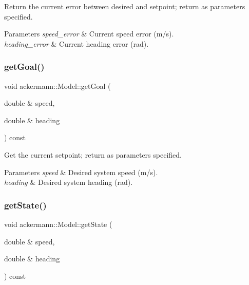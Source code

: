 Return the current error between desired and setpoint; return as parameters specified. 


\begin{DoxyParams}{Parameters}
{\em speed\+\_\+error} & Current speed error (m/s). \\
\hline
{\em heading\+\_\+error} & Current heading error (rad). \\
\hline
\end{DoxyParams}
\mbox{\label{classackermann_1_1_model_a37c42fe7705a2b3106b0faff813bfcad}} 
\subsubsection{\texorpdfstring{get\+Goal()}{getGoal()}}
{\footnotesize\ttfamily void ackermann\+::\+Model\+::get\+Goal (\begin{DoxyParamCaption}\item[{double \&}]{speed,  }\item[{double \&}]{heading }\end{DoxyParamCaption}) const}



Get the current setpoint; return as parameters specified. 


\begin{DoxyParams}{Parameters}
{\em speed} & Desired system speed (m/s). \\
\hline
{\em heading} & Desired system heading (rad). \\
\hline
\end{DoxyParams}
\mbox{\label{classackermann_1_1_model_a770662c33060369f437a098c944ca262}} 
\subsubsection{\texorpdfstring{get\+State()}{getState()}}
{\footnotesize\ttfamily void ackermann\+::\+Model\+::get\+State (\begin{DoxyParamCaption}\item[{double \&}]{speed,  }\item[{double \&}]{heading }\end{DoxyParamCaption}) const}



